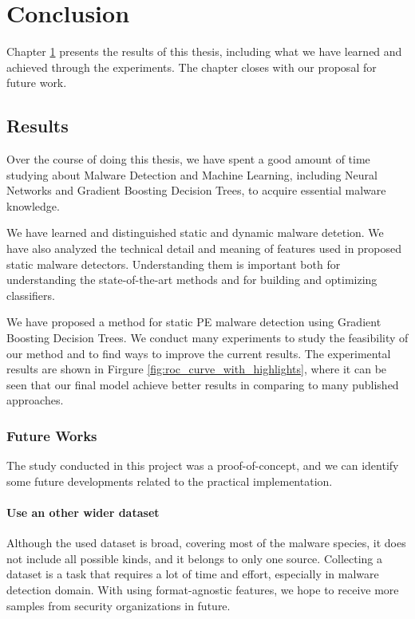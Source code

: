 \chapter{Conclusion} 
\label{chap:conclusion}

\begin{chapabstract}
Chapter \ref{chap:conclusion} presents the results of this thesis, including what we have learned and achieved through the experiments. The chapter closes with our proposal for future work.
\end{chapabstract}

\section{Results}

Over the course of doing this thesis, we have spent a good amount of time studying about Malware Detection and Machine Learning, including Neural Networks and Gradient Boosting Decision Trees, to acquire essential malware knowledge. 

We have learned and distinguished static and dynamic malware detetion. We have also analyzed the technical detail and meaning of features used in proposed static malware detectors. Understanding them is important both for understanding the state-of-the-art methods and for building and optimizing classifiers.

We have proposed a method for static PE malware detection using Gradient Boosting Decision Trees. We conduct many experiments to study the feasibility of our method and to find ways to improve the current results. The experimental results are shown in Firgure \ref{fig:roc_curve_with_highlights}, where it can be seen that our final model achieve better results in comparing to many published approaches.

\subsection{Future Works}

The study conducted in this project was a proof-of-concept, and we can identify some future developments related to the practical implementation.

\subsubsection{Use an other wider dataset}

Although the used dataset is broad, covering most of the malware species, it does not include all possible kinds, and it belongs to only one source.  Collecting a dataset is a task that requires a lot of time and effort, especially in malware detection domain. With using format-agnostic features, we hope to receive more samples from security organizations in future. 

